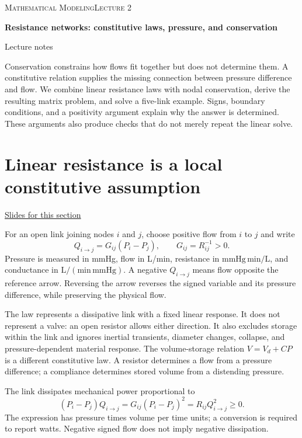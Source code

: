 \documentclass[11pt,letterpaper]{article}
\theoremstyle{definition}\newtheorem{definition}{Definition}\newtheorem{example}{Example}
\numberwithin{equation}{section}
\begin{document}
{\small\scshape Mathematical Modeling\hfill Lecture 2}\par\medskip
{\raggedright{}\LARGE\bfseries\color{ink} Resistance networks: constitutive laws, pressure, and conservation\par}\medskip
{\small Lecture notes}\par\bigskip
Conservation constrains how flows fit together but does not determine them. A constitutive relation supplies the missing connection between pressure difference and flow. We combine linear resistance laws with nodal conservation, derive the resulting matrix problem, and solve a five-link example. Signs, boundary conditions, and a positivity argument explain why the answer is determined. These arguments also produce checks that do not merely repeat the linear solve.

\section{Linear resistance is a local constitutive assumption}
\hypertarget{note-linear-resistance-is-a-local-constitutive-assumption}{}\label{note:linear-resistance-is-a-local-constitutive-assumption}
{\small \href{slides.html\#frame=conservation-needs-a-constitutive-law\&step=1}{Slides for this section}}\par
For an open link joining nodes $i$ and $j$, choose positive flow from $i$ to $j$ and write
\[
Q_{i\to j}=G_{ij}(P_i-P_j),\qquad G_{ij}=R_{ij}^{-1}>0.
\]
Pressure is measured in mmHg, flow in L/min, resistance in $\mathrm{mmHg}\,\mathrm{min}/\mathrm L$, and conductance in $\mathrm L/(\mathrm{min}\,\mathrm{mmHg})$. A negative $Q_{i\to j}$ means flow opposite the reference arrow. Reversing the arrow reverses the signed variable and its pressure difference, while preserving the physical flow.

The law represents a dissipative link with a fixed linear response. It does not represent a valve: an open resistor allows either direction. It also excludes storage within the link and ignores inertial transients, diameter changes, collapse, and pressure-dependent material response. The volume-storage relation $V=V_d+CP$ is a different constitutive law. A resistor determines a flow from a pressure difference; a compliance determines stored volume from a distending pressure.

The link dissipates mechanical power proportional to
\[
(P_i-P_j)Q_{i\to j}=G_{ij}(P_i-P_j)^2=R_{ij}Q_{i\to j}^{2}\geq0.
\]
The expression has pressure times volume per time units; a conversion is required to report watts. Negative signed flow does not imply negative dissipation.
\end{document}
